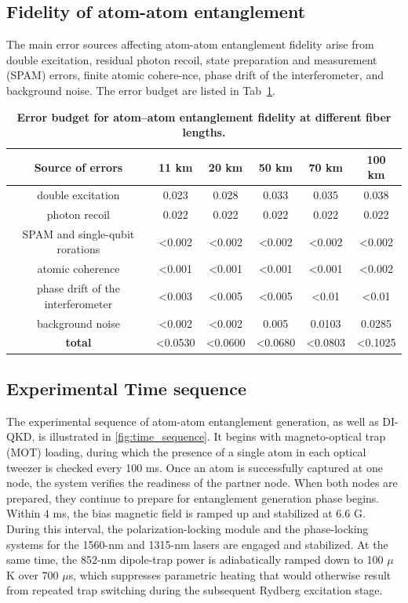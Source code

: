 \documentclass[aps,reprint,showpacs,superscriptaddress]{revtex4-2}
\begin{document}
\subsection{Fidelity of atom-atom entanglement}
The main error sources affecting atom-atom entanglement fidelity arise from double excitation, residual photon recoil, state preparation and measurement (SPAM) errors, finite atomic cohere-nce, phase drift of the interferometer, and background noise. The error budget are listed in Tab~\ref{tab:sup_error_budget}.

\begin{table}[htbp]
	\centering

	\caption{\textbf{Error budget for atom–atom entanglement fidelity at different fiber lengths.}
	}
	\label{tab:sup_error_budget}

	\begin{tabular}{|c|c|c|c|c|c|}
		\hline
		\textbf{Source of errors} & \textbf{11 km} & \textbf{20 km} & \textbf{50 km} & \textbf{70 km} & \textbf{100 km} \\
		\hline
		double excitation &0.023&0.028&0.033&0.035&0.038\\
		\hline
		photon recoil &0.022&0.022&0.022&0.022&0.022\\
		\hline
		SPAM and single-qubit rorations &<0.002&<0.002&<0.002&<0.002&<0.002\\
		\hline
		atomic coherence &<0.001&<0.001&<0.001&<0.001&<0.002\\
		\hline
		phase drift of the interferometer &<0.003&<0.005&<0.005&<0.01&<0.01\\
		\hline
		background noise &<0.002&<0.002&0.005&0.0103&0.0285\\
		\hline
		\textbf{total} &<0.0530 & <0.0600 & <0.0680 & <0.0803 & <0.1025\\
		\hline
	\end{tabular}
\end{table}

\subsection{Experimental Time sequence}
The experimental sequence of atom-atom entanglement generation, as well as DI-QKD, is illustrated in \ref{fig:time_sequence}. It begins with magneto-optical trap (MOT) loading, during which the presence of a single atom in each optical tweezer is checked every 100 ms. Once an atom is successfully captured at one node, the system verifies the readiness of the partner node. When both nodes are prepared, they continue to prepare for entanglement generation phase begins. Within 4 ms, the bias magnetic field is ramped up and stabilized at 6.6 G. During this interval, the polarization-locking module and the phase-locking systems for the 1560-nm and 1315-nm lasers are engaged and stabilized. At the same time, the 852-nm dipole-trap power is adiabatically ramped down to 100 $\mu$K over 700 $\mu$s, which suppresses parametric heating that would otherwise result from repeated trap switching during the subsequent Rydberg excitation stage.
\end{document}
